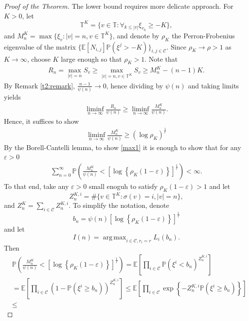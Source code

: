 \documentclass[12pt]{article}
\numberwithin{equation}{section}
\DeclareMathOperator*{\argmax}{arg\,max}
\begin{document}
\begin{proof} [Proof of the Theorem]
The lower bound requires more delicate approach. For $K > 0$, let \[\mathbb{T}^K = \{v \in \mathbb{T} : \forall_{k \leq |v|} \xi_{v_k} \geq -K\},\] and $M^K_n = \max \{\xi_v: |v|=n, v \in \mathbb{T}^K\}$, and denote by $\rho_K$ the Perron-Frobenius eigenvalue of the matrix $\{\mathbb{E}[N_{i,j}]\mathbb{P}(\xi^j > -K)\}_{i,j \in \mathcal{C}}$. Since $\rho_K \rightarrow \rho > 1$ as $K \rightarrow \infty$, choose $K$ large enough so that $\rho_K > 1$. Note that 
\begin{align}
    R_n = \max_{|v|=n} S_v \geq \max_{|v|=n, v \in \mathbb{T}^K} S_v \geq M^K_n - (n-1)K.
\end{align}
By Remark \ref{t2:remark}, $\frac {n-1} {\psi(n)} \rightarrow 0$, hence dividing by $\psi(n)$ and taking limits yields 
\begin{align}
\liminf_{n \rightarrow \infty} \frac {R_n} {\psi(n)} \geq \liminf_{n \rightarrow \infty}\frac {M^K_n} {\psi(n)}.
\end{align}
    Hence, it suffices to show 
    \begin{align}\label{max1} \liminf_{n \rightarrow \infty}\frac {M^K_n} {\psi(n)} \geq  (\log \rho_K)^{\frac 1 {r}}
    \end{align}
    By the Borell-Cantelli lemma, to show \eqref{max1} it is enough to show that for any $\varepsilon > 0$
    \begin{align}\label{max} \sum_{n=0}^\infty \mathbb{P} \left( \frac {M^K_n} {\psi(n)} < \left[\log \left\{\rho_K(1-\varepsilon)\right\}\right]^{\frac 1 {r}} \right) <\infty.
    \end{align}
    To that end, take any $\varepsilon > 0$ small enoguh to satisfy $\rho_K(1-\varepsilon) >1$ and let \[Z^{K,i}_n = \#\{v \in \mathbb{T}^K: \sigma(v) =i, |v|=n\},\] and $Z^K_n = \sum_{i \in \mathcal{C}} Z^{K,i}_n$. To simplify the notation, denote \[b_n = \psi(n) \left[\log \left\{\rho_K(1-\varepsilon)\right\}\right]^{\frac 1 {r}}\] and let \[
    I(n) = \argmax_{i \in \mathcal{C}, r_i = r} L_i\left( b_n \right) .
    \]  Then
    \begin{align*}
        &\mathbb{P} \left( \frac {M^K_n} {\psi(n)} < \left[\log \left\{\rho_K(1-\varepsilon)\right\}\right]^{\frac 1 {r}} \right) = \mathbb{E} \left[ \prod_{i \in \mathcal{C}}\mathbb{P} \left( \xi^i < b_n  \right)^{Z^{K,i}_n} \right] \\&=
        \mathbb{E} \left[\prod_{i \in \mathcal{C}} \left(1- \mathbb{P} \left( \xi^i \geq b_n  \right)\right)^{Z^{K,i}_n} \right] \leq
        \mathbb{E} \left[ \prod_{i \in \mathcal{C}}\exp \left\{ -{Z^{K,i}_n} \mathbb{P} \left( \xi^i \geq b_n  \right) \right\} \right] \\&\leq

\end{align*}
\end{proof}
\end{document}
